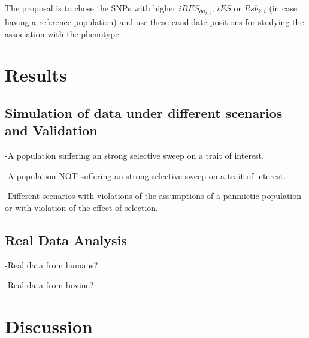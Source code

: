 \documentclass[a4paper,11pt]{article}
\begin{document}

\noindent The proposal is to chose the SNPs with higher $iRES_{da_{k,i}}$, $iES$ or $Rsb_{k,i}$ (in case having a reference population) and use  these candidate positions for studying the association with the phenotype.

\section{Results}
\subsection{Simulation of data under different scenarios and Validation}
\noindent -A  population suffering an strong selective sweep on a trait of interest.\par
\noindent -A  population NOT suffering an strong selective sweep on a trait of interest.\par
\noindent -Different scenarios with violations of the assumptions of a panmictic population or with violation of the effect of selection. %

\subsection{Real Data Analysis}
\noindent -Real data from humans?\par
\noindent -Real data from bovine?\par

\section{Discussion}


\newpage


\end{document}
